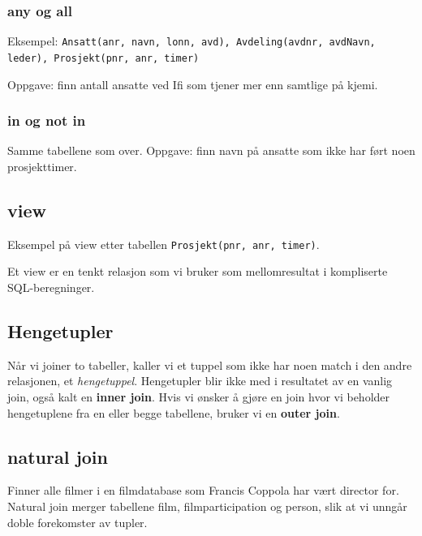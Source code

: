 \documentclass[11pt,a4paper]{article}
\begin{document}
\subsubsection{any og all}
Eksempel: \texttt{Ansatt(anr, navn, lonn, avd), Avdeling(avdnr, avdNavn, leder), Prosjekt(pnr, anr, timer)}

Oppgave: finn antall ansatte ved Ifi som tjener mer enn samtlige på kjemi.

\subsubsection{in og not in}
Samme tabellene som over. Oppgave: finn navn på ansatte som ikke har ført noen prosjekttimer.


\subsection{view}
Eksempel på view etter tabellen \texttt{Prosjekt(pnr, anr, timer)}.


Et view er en tenkt relasjon som vi bruker som mellomresultat i kompliserte SQL-beregninger.

\subsection{Hengetupler}
Når vi joiner to tabeller, kaller vi et tuppel som ikke har noen match i den andre relasjonen, et \textit{hengetuppel}.
Hengetupler blir ikke med i resultatet av en vanlig join, også kalt en \textbf{inner join}. Hvis vi ønsker å gjøre en join hvor vi beholder hengetuplene fra en eller begge tabellene, bruker vi en \textbf{outer join}.

\subsection{natural join}

Finner alle filmer i en filmdatabase som Francis Coppola har vært director for. Natural join merger tabellene film, filmparticipation og person, slik at vi unngår doble forekomster av tupler.
\end{document}
